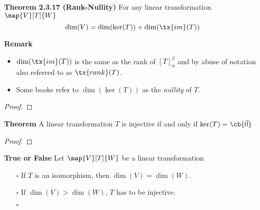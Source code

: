 \documentclass[letterpaper, 10pt]{article}
\begin{document}
\newpage
\lb
\textbf{Theorem 2.3.17 (Rank-Nullity)}
\lb
For any linear transformation $\map{V}[T]{W}$
\[ \dim(V) = \dim(\ker(T)) + \dim( \tx{im}(T)) \]


\lb
\textbf{Remark} 
\begin{itemize}
    \item 
        $\dim( \tx{im}(T))$ is the same as the rank of $[T]_α^β$ and by abuse of
        notation also referred to as $\tx{rank}(T)$.
    \item
        Some books refer to $\dim(\ker(T))$ as the \emph{nullity} of $T$.
\end{itemize}

\begin{proof}
\end{proof}


\vspace{300pt}
\lb
\textbf{Theorem}
\lb
A linear transformation $T$ is injective if and only if $\ker(T) = \cb{\vec 0}$
\begin{proof}
\end{proof}



\newpage
\lb
\textbf{True or False} 
Let $\map{V}[T]{W}$ be a linear transformation
\begin{enumerate}
    \item[$\square$]
        If $T$ is an isomorphism, then $\dim(V) = \dim(W)$.
    \item[$\square$]
        If $\dim(V) > \dim(W)$, $T$ has to be injective.
    \item[$\square$]
\end{enumerate}
\end{document}
